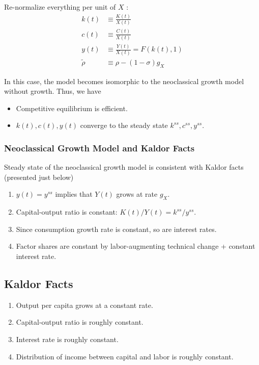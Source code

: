 \documentclass[10pt]{article}
\begin{document}
Re-normalize everything per unit of $X$ :
$$
\begin{aligned}
k(t) & \equiv \frac{K(t)}{X(t)} \\
c(t) &\equiv \frac{C(t)}{X(t)} \\
y(t) & \equiv \frac{Y(t)}{X(t)}=F(k(t), 1) \\
\tilde{\rho} &\equiv \rho-(1-\sigma) g_X
\end{aligned}
$$

In this case, the model becomes isomorphic to the neoclassical growth model
without growth. Thus, we have 

\begin{itemize}
    \item Competitive equilibrium is efficient.
    \item $k(t), c(t), y(t)$ converge to the steady state $k^{ss}, c^{ss}, y^{ss}$.
\end{itemize}

\subsubsection{Neoclassical Growth Model and Kaldor Facts}

Steady state of the neoclassical growth model is consistent with Kaldor
facts (presented just below)

\begin{enumerate}
    \item $y(t)=y^{ss}$ implies that $Y(t)$ grows at rate $g_X$.
    \item Capital-output ratio is constant: $K(t) / Y(t)=k^{ss} / y^{ss}$.
    \item Since consumption growth rate is constant, so are interest rates.
    \item Factor shares are constant by labor-augmenting technical change + constant interest rate.
\end{enumerate}


\subsection{Kaldor Facts}

\begin{enumerate}
    \item Output per capita grows at a constant rate.
    \item Capital-output ratio is roughly constant.
    \item Interest rate is roughly constant.
    \item Distribution of income between capital and labor is roughly constant.
\end{enumerate}
\end{document}
